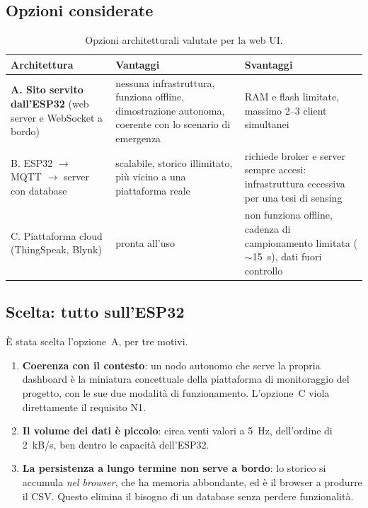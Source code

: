 \subsection{Opzioni considerate}

\begin{table}[htbp]
\centering
\caption{Opzioni architetturali valutate per la web UI.}
\label{tab:webui-opzioni}
\small
\begin{tabularx}{\linewidth}{@{}lXX@{}}
\toprule
\textbf{Architettura} & \textbf{Vantaggi} & \textbf{Svantaggi} \\
\midrule
\textbf{A. Sito servito dall'ESP32} (web server e WebSocket a bordo) &
  nessuna infrastruttura, funziona offline, dimostrazione autonoma, coerente con lo
  scenario di emergenza &
  RAM e flash limitate, massimo 2--3 client simultanei \\
B. ESP32 $\to$ MQTT $\to$ server con database &
  scalabile, storico illimitato, più vicino a una piattaforma reale &
  richiede broker e server sempre accesi: infrastruttura eccessiva per una tesi di
  sensing \\
C. Piattaforma cloud (ThingSpeak, Blynk) &
  pronta all'uso &
  non funziona offline, cadenza di campionamento limitata ($\sim$15~s), dati fuori
  controllo \\
\bottomrule
\end{tabularx}
\end{table}

\subsection{Scelta: tutto sull'ESP32}

È stata scelta l'opzione~A, per tre motivi.

\begin{enumerate}[leftmargin=1.8em,itemsep=3pt]
  \item \textbf{Coerenza con il contesto}: un nodo autonomo che serve la propria
        dashboard è la miniatura concettuale della piattaforma di monitoraggio del
        progetto, con le sue due modalità di funzionamento. L'opzione~C viola
        direttamente il requisito N1.
  \item \textbf{Il volume dei dati è piccolo}: circa venti valori a 5~Hz,
        dell'ordine di 2~kB/s, ben dentro le capacità dell'ESP32.
  \item \textbf{La persistenza a lungo termine non serve a bordo}: lo storico si
        accumula \emph{nel browser}, che ha memoria abbondante, ed è il browser a
        produrre il CSV. Questo elimina il bisogno di un database senza perdere
        funzionalità.
\end{enumerate}

